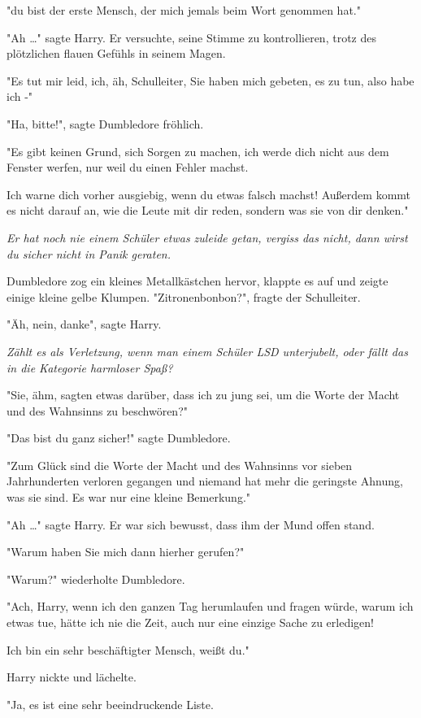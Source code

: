 {"du bist der erste Mensch, der mich jemals beim Wort genommen hat."

"Ah …" sagte Harry. Er versuchte, seine Stimme zu kontrollieren, trotz des plötzlichen flauen Gefühls in seinem Magen.

"Es tut mir leid, ich, äh, Schulleiter, Sie haben mich gebeten, es zu tun, also habe ich -"

"Ha, bitte!", sagte Dumbledore fröhlich.

"Es gibt keinen Grund, sich Sorgen zu machen, ich werde dich nicht aus dem Fenster werfen, nur weil du einen Fehler machst.

Ich warne dich vorher ausgiebig, wenn du etwas falsch machst! Außerdem kommt es nicht darauf an, wie die Leute mit dir reden, sondern was sie von dir denken."

\emph{Er hat noch nie einem Schüler etwas zuleide getan, vergiss das nicht, dann wirst du sicher nicht in Panik geraten.}

Dumbledore zog ein kleines Metallkästchen hervor, klappte es auf und zeigte einige kleine gelbe Klumpen. "Zitronenbonbon?", fragte der Schulleiter.

"Äh, nein, danke", sagte Harry.

\emph{Zählt es als Verletzung, wenn man einem Schüler LSD unterjubelt, oder fällt das in die Kategorie harmloser Spaß?}

"Sie, ähm, sagten etwas darüber, dass ich zu jung sei, um die Worte der Macht und des Wahnsinns zu beschwören?"

"Das bist du ganz sicher!" sagte Dumbledore.

"Zum Glück sind die Worte der Macht und des Wahnsinns vor sieben Jahrhunderten verloren gegangen und niemand hat mehr die geringste Ahnung, was sie sind. Es war nur eine kleine Bemerkung."

"Ah …" sagte Harry. Er war sich bewusst, dass ihm der Mund offen stand.

"Warum haben Sie mich dann hierher gerufen?"

"Warum?" wiederholte Dumbledore.

"Ach, Harry, wenn ich den ganzen Tag herumlaufen und fragen würde, warum ich etwas tue, hätte ich nie die Zeit, auch nur eine einzige Sache zu erledigen!

Ich bin ein sehr beschäftigter Mensch, weißt du."

Harry nickte und lächelte.

"Ja, es ist eine sehr beeindruckende Liste.

}
